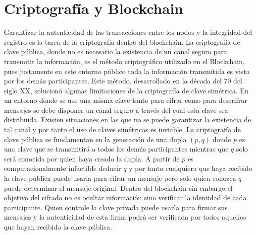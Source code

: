 
\cleardoublepage

\chapter{Criptografía y Blockchain}
\label{cap1}

Garantizar la autenticidad de las transacciones entre los nodos y la integridad del registro es la tarea de la criptografía dentro del blockchain. La criptografía de clave pública, donde no es necesario la existencia de un canal seguro para transmitir la información, es el método criptográfico utilizado en el Blockchain, pues justamente en este entorno público toda la información transmitida es vista por los demás participantes.
Este método, desarrollado en la década del 70 del siglo XX, solucionó algunas limitaciones de la criptografía de clave simétrica. En un entorno donde se use una misma clave tanto para cifrar como para descrifrar mensajes se debe disponer un canal seguro a través del cual esta clave sea distribuida. Existen situaciones en las que no se puede garantizar la existencia de tal canal y por tanto el uso de claves simétricas es inviable.
La criptografía de clave pública se fundamentan en la generación de una dupla $(p,q)$ donde $p$ es una clave que se transmitirá a todos los demás participantes mientras que $q$ solo será conocida por quien haya creado la dupla. A partir de $p$ es computacionalmente infactible deducir $q$ y por tanto cualquiera que haya recibido la clave pública puede usarla para cifrar un mensaje pero solo quien conozca $q$ puede determinar el mensaje original. Dentro del blockchain sin embargo el objetivo del cifrado no es ocultar información sino verificar la identidad de cada participante. Quien controle la clave privada puede usarla para firmar sus mensajes y la autenticidad de esta firma podrá ser verificada por todos aquellos que hayan recibido la clave pública. 

